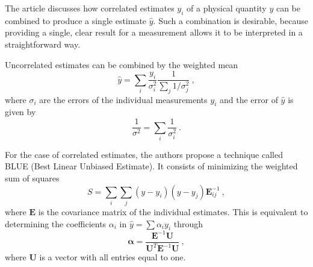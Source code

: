 

\usetikzlibrary{calc}
\usetikzlibrary{arrows,shapes}

\newcommand{\package}[1]{\texttt{#1}}
\newcommand{\class}[1]{\texttt{#1}}
\newcommand{\function}[1]{\texttt{#1}}
\newcommand{\fpath}[1]{\texttt{#1}}

\captionsetup{width=0.45\textwidth}

\newcommand{\eg}{e.g.\@ }

\usepackage{hyphenat}




The article\cite{lyons} discusses how correlated estimates $y_i$ of a physical quantity $y$ can be combined to produce a single estimate $\hat{y}$.
Such a combination is desirable, because providing a single, clear result for a measurement allows it to be interpreted in a straightforward way.

Uncorrelated estimates can be combined by the weighted mean
\begin{equation}
  \hat{y} = \sum_i{\frac{y_i}{\sigma_i^2}} \frac{1}{\sum_j 1/\sigma_j^2}\:,
\end{equation}
where $σ_i$ are the errors of the individual measurements $y_i$ and the error of $\hat{y}$ is given by
\begin{equation}
  \frac{1}{σ^2} = \sum_i \frac{1}{σ_i^2}\:.
\end{equation}

For the case of correlated estimates, the authors propose a technique called BLUE (Best Linear Unbiased Estimate).
It consists of minimizing the weighted sum of squares
\begin{equation}
  S = \sum_i \sum_j (y - y_i) (y - y_j) \mathbf{E}^{-1}_{ij}\:,
  \label{squares}
\end{equation}
where $\mathbf{E}$ is the covariance matrix of the individual estimates.
This is equivalent to determining the coefficients $α_i$ in $\hat{y} = \sum \alpha_i y_i$ through
\begin{equation}
  \mathbf{\alpha} = \frac{\mathbf{E}^{-1} \mathbf{U}}{\mathbf{U}^T \mathbf{E}^{-1} \mathbf{U}}\:,
\end{equation}
where $\mathbf{U}$ is a vector with all entries equal to one.

